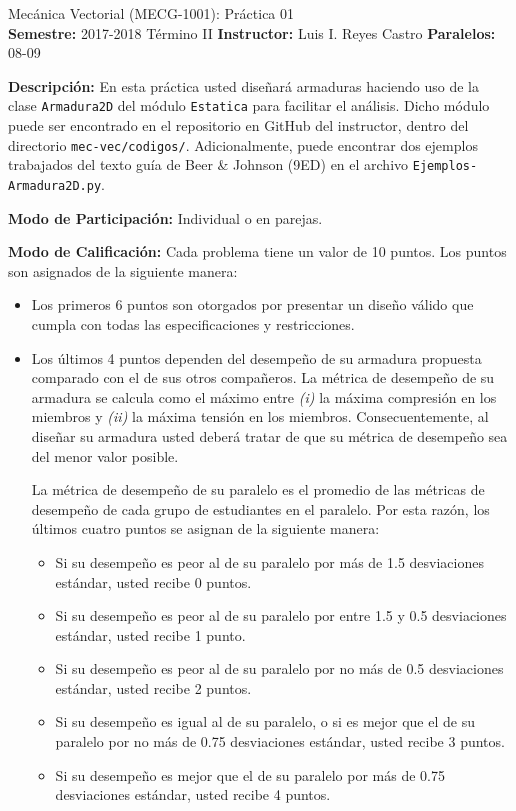 \documentclass[ a4paper, twoside, 11pt]{article}
\newcommand{\numero}{01}
\begin{document}
\allowdisplaybreaks

\begin{center}
\Large Mec\'anica Vectorial (MECG-1001): Pr\'actica \numero \\[2ex]
\small \textbf{Semestre:} 2017-2018 T\'ermino II \qquad
\textbf{Instructor:} Luis I. Reyes Castro \qquad
\textbf{Paralelos:} 08-09
\end{center}
\fullskip

\textbf{Descripci\'on:} En esta pr\'actica usted dise\~nar\'a armaduras haciendo uso de la clase \texttt{Armadura2D} del m\'odulo \texttt{Estatica} para facilitar el an\'alisis. Dicho m\'odulo puede ser encontrado en el repositorio en GitHub del instructor, dentro del directorio \texttt{mec-vec/codigos/}. Adicionalmente, puede encontrar dos ejemplos trabajados del texto gu\'ia de Beer \& Johnson (9ED) en el archivo \texttt{Ejemplos-Armadura2D.py}. 
\halfskip

\textbf{Modo de Participaci\'on:} Individual o en parejas. 
\halfskip

\textbf{Modo de Calificaci\'on:} Cada problema tiene un valor de 10 puntos. Los puntos son asignados de la siguiente manera: 
\begin{itemize}
\item Los primeros 6 puntos son otorgados por presentar un dise\~no v\'alido que cumpla con todas las especificaciones y restricciones. 
\item Los \'ultimos 4 puntos dependen del desempe\~no de su armadura propuesta comparado con el de sus otros compa\~neros. La m\'etrica de desempe\~no de su armadura se calcula como el m\'aximo entre \textit{(i)} la m\'axima compresi\'on en los miembros y \textit{(ii)} la m\'axima tensi\'on en los miembros. Consecuentemente, al dise\~nar su armadura usted deber\'a tratar de que su m\'etrica de desempe\~no sea del menor valor posible. 

La m\'etrica de desempe\~no de su paralelo es el promedio de las m\'etricas de desempe\~no de cada grupo de estudiantes en el paralelo. Por esta raz\'on, los \'ultimos cuatro puntos se asignan de la siguiente manera: 
\begin{itemize}
\item Si su desempe\~no es peor al de su paralelo por m\'as de 1.5 desviaciones est\'andar, usted recibe 0 puntos. 
\item Si su desempe\~no es peor al de su paralelo por entre 1.5 y 0.5 desviaciones est\'andar, usted recibe 1 punto. 
\item Si su desempe\~no es peor al de su paralelo por no m\'as de 0.5 desviaciones est\'andar, usted recibe 2 puntos. 
\item Si su desempe\~no es igual al de su paralelo, o si es mejor que el de su paralelo por no m\'as de 0.75 desviaciones est\'andar, usted recibe 3 puntos. 
\item Si su desempe\~no es mejor que el de su paralelo por m\'as de 0.75 desviaciones est\'andar, usted recibe 4 puntos. 
\end{itemize}

\end{itemize}
\newpage
\end{document}
